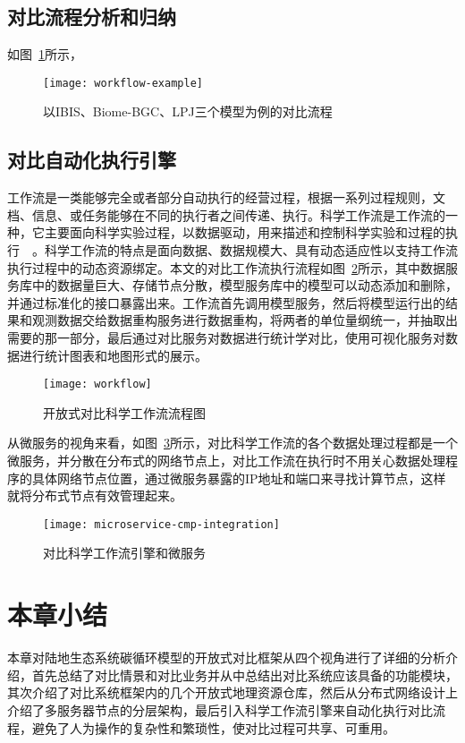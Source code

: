 \subsection{对比流程分析和归纳}
如图~\ref{fig:workflow-example}所示，

\begin{figure}[!htbp]
    \centering
    \texttt{[image: workflow-example]}
    \caption{以IBIS、Biome-BGC、LPJ三个模型为例的对比流程}
    \label{fig:workflow-example}
\end{figure}

\subsection{对比自动化执行引擎}
工作流是一类能够完全或者部分自动执行的经营过程，根据一系列过程规则，文档、信息、或任务能够在不同的执行者之间传递、执行。科学工作流是工作流的一种，它主要面向科学实验过程，以数据驱动，用来描述和控制科学实验和过程的执行~\cite{ludascher2006scientific}~\cite{Zhao2009Special}。科学工作流的特点是面向数据、数据规模大、具有动态适应性以支持工作流执行过程中的动态资源绑定。本文的对比工作流执行流程如图~\ref{fig:workflow}所示，其中数据服务库中的数据量巨大、存储节点分散，模型服务库中的模型可以动态添加和删除，并通过标准化的接口暴露出来。工作流首先调用模型服务，然后将模型运行出的结果和观测数据交给数据重构服务进行数据重构，将两者的单位量纲统一，并抽取出需要的那一部分，最后通过对比服务对数据进行统计学对比，使用可视化服务对数据进行统计图表和地图形式的展示。

\begin{figure}[!htbp]
    \centering
    \texttt{[image: workflow]}
    \caption{开放式对比科学工作流流程图}
    \label{fig:workflow}
\end{figure}

从微服务的视角来看，如图~\ref{fig:microservice-cmp-integration}所示，对比科学工作流的各个数据处理过程都是一个微服务，并分散在分布式的网络节点上，对比工作流在执行时不用关心数据处理程序的具体网络节点位置，通过微服务暴露的IP地址和端口来寻找计算节点，这样就将分布式节点有效管理起来。

\begin{figure}[!htbp]
    \centering
    \texttt{[image: microservice-cmp-integration]}
    \caption{对比科学工作流引擎和微服务}
    \label{fig:microservice-cmp-integration}
\end{figure}


\section{本章小结}
本章对陆地生态系统碳循环模型的开放式对比框架从四个视角进行了详细的分析介绍，首先总结了对比情景和对比业务并从中总结出对比系统应该具备的功能模块，其次介绍了对比系统框架内的几个开放式地理资源仓库，然后从分布式网络设计上介绍了多服务器节点的分层架构，最后引入科学工作流引擎来自动化执行对比流程，避免了人为操作的复杂性和繁琐性，使对比过程可共享、可重用。

